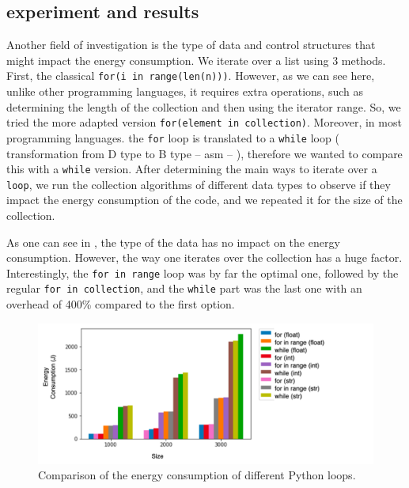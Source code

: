 \subsection{experiment and results}
Another field of investigation is the type of data and control structures that might impact the energy consumption.
We iterate over a list using 3 methods.
First, the classical \texttt{for(i in range(len(n)))}.
However, as we can see here, unlike other programming languages, it requires extra operations, such as determining the length of the collection and then using the iterator range.
So, we tried the more adapted version \texttt{for(element in collection)}.
Moreover, in most programming languages. the \texttt{for} loop is translated to a \texttt{while} loop ( transformation from D type to B type -- asm -- ), therefore we wanted to compare this with a \texttt{while} version.
After determining the main ways to iterate over a \texttt{loop}, we run the collection algorithms of different data types to observe if they impact the energy consumption of the code, and we repeated it for the size of the collection.

As one can see in , the type of the data has no impact on the energy consumption.
However, the way one iterates over the collection has a huge factor.
Interestingly, the \texttt{for in range} loop was by far the optimal one, followed by the regular \texttt{for in collection}, and the \texttt{while} part was the last one with an overhead of 400\% compared to the first option.

\begin{figure}
    \centering
    \includegraphics[width=\linewidth]{imgs/python_iterations}
    \caption{Comparison of the energy consumption of different Python loops.}
    \label{fig:pythonloops}
\end{figure}

